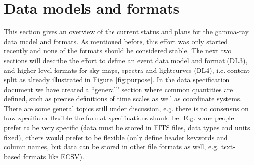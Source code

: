 \section{Data models and formats}

This section gives an overview of the current status and plans for the gamma-ray data model and formats. As mentioned before, this effort was only started recently and none of the formats should be considered stable. The next two sections will describe the effort to define an event data model and format (DL3), and higher-level formats for sky-maps, spectra and lightcurves (DL4), i.e. content split as already illustrated in Figure~\ref{fig:purpose}.
In the data specification document we have created a ``general'' section where common quantities are defined, such as precise definitions of time scales as well as coordinate systems. 
%
%
There are some general topics still under discussion, e.g. there is no consensus on how specific or flexible the format specifications should be. E.g. some people prefer to be very specific (data must be stored in FITS files, data types and units fixed), others would prefer to be flexible (only define header keywords and column names, but data can be stored in other file formats as well, e.g. text-based formats like ECSV).
% 




